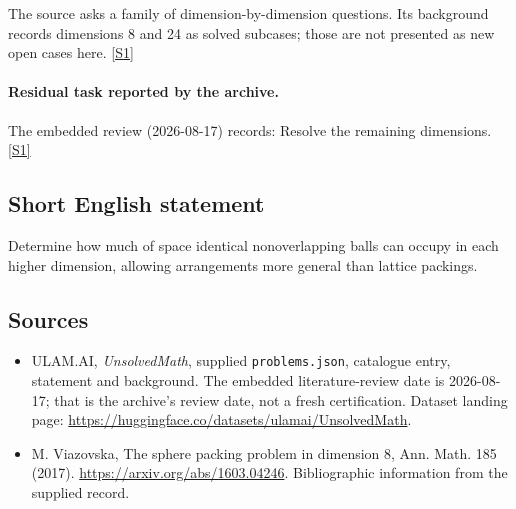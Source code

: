 \documentclass[11pt,a4paper]{article}
\newcommand{\sref}[2]{\hyperlink{source:#1:#2}{[S#2]}}
\begin{document}
The source asks a family of dimension-by-dimension questions. Its background records dimensions 8 and 24 as solved subcases; those are not presented as new open cases here. \sref{statement}{1}

\paragraph{Residual task reported by the archive.}

The embedded review (2026-08-17) records: Resolve the remaining dimensions. \sref{statement}{1}

\subsection{Short English statement}

Determine how much of space identical nonoverlapping balls can occupy in each higher dimension, allowing arrangements more general than lattice packings.

\subsection{Sources}

{\small

\begin{itemize}

\item[\hypertarget{source:statement:1}{S1}] ULAM.AI, \emph{UnsolvedMath}, supplied \texttt{problems.json}, catalogue entry, statement and background. The embedded literature-review date is 2026-08-17; that is the archive’s review date, not a fresh certification. Dataset landing page: \url{https://huggingface.co/datasets/ulamai/UnsolvedMath}.

\item[\hypertarget{source:statement:2}{S2}] M. Viazovska, The sphere packing problem in dimension 8, Ann. Math. 185 (2017). \url{https://arxiv.org/abs/1603.04246}. Bibliographic information from the supplied record.

\end{itemize}

}

\label{end:statement}
\end{document}
